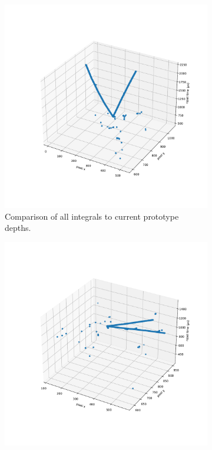 \begin{figure}
\centering
\begin{subfigure}{.5\textwidth}
  \centering
  \includegraphics[width=\textwidth]{images/example_zdir_scatter.pdf}
  \caption{Comparison of all integrals to current prototype depths.}
\end{subfigure}%
\begin{subfigure}{.5\textwidth}
  \centering
  \includegraphics[width=\textwidth]{images/example_xdir_scatter.pdf}

\end{subfigure}
\end{figure}

